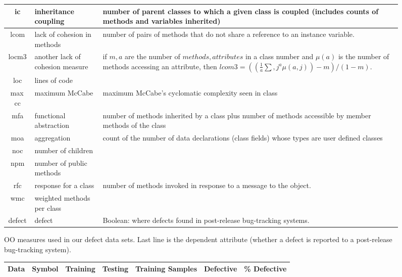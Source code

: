 \documentclass[conference]{IEEEtran}
\begin{document}
{\begin{figure}[htbp!]
\begin{center}
{\begin{tabular}{c|l|p{4.7in}}
        ic & inheritance coupling &  number of parent classes to which a given
        class is coupled (includes counts of methods and variables inherited)
        \\\hline
        lcom & lack of cohesion in methods &number of pairs of methods that do
        not share a reference to an instance variable.\\\hline
        locm3 & another lack of cohesion measure & if $m,a$ are  the number of
        $methods,attributes$
        in a class number and $\mu(a)$  is the number of methods accessing an
        attribute, 
        then
        $lcom3=((\frac{1}{a} \sum, j^a \mu(a, j)) - m)/ (1-m)$.
        \\\hline
        loc & lines of code &\\\hline
        max\, cc & maximum McCabe & maximum McCabe's cyclomatic complexity seen
        in class\\\hline
        mfa & functional abstraction & number of methods inherited by a class
        plus number of methods accessible by member methods of the
        class\\\hline
        moa &  aggregation &  count of the number of data declarations (class
        fields) whose types are user defined classes\\\hline
        noc &  number of children &\\\hline
        npm & number of public methods & \\\hline
        rfc & response for a class &number of  methods invoked in response to
        a message to the object.\\\hline
        wmc & weighted methods per class &\\\hline
        \rowcolor{lightgray}
        defect & defect & Boolean: where defects found in post-release bug-tracking systems.
      \end{tabular}
    }
  \end{center}
  \caption{OO measures used in our defect data sets.  Last line is
    the dependent attribute (whether a defect is reported to  a
    post-release bug-tracking system).}\label{fig:ck}
\end{figure}

\begin{figure}[!tb]
  \renewcommand{\baselinestretch}{0.8}\begin{center}
{\scriptsize
\begin{tabular}{l@{~~~}l@{~~~}l@{~~~}l@{~~~}l@{~~~}l@{~~~}l@{~~}}
  \hline
  \rowcolor{lightgray}
  Data & Symbol & Training & Testing & Training Samples& Defective &\% Defective \\\hline


\end{tabular}}
\end{center}
\end{figure}}
\end{document}
